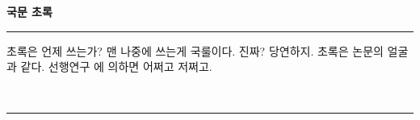 %

\begin{center}
  {\Large\textbf{국문 초록}}
  \noindent\rule{\textwidth}{.12mm}
\end{center}

초록은 언제 쓰는가? 맨 나중에 쓰는게 국룰이다. 진짜? 당연하지. 초록은 논문의 얼굴과 같다. 선행연구 \citep{smith1987tiling}에 의하면 어쩌고 저쩌고.

\vskip5pt
\ \mykeywordsko

\noindent\rule{\textwidth}{.12mm}
